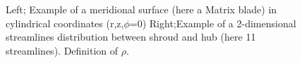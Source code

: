 \begin{figure}[h!]
\begin{minipage}[b]{0.5\linewidth}
 \centering
\end{minipage}
\begin{minipage}[b]{0.5\linewidth}
 \centering
\end{minipage}
\caption{Left; Example of a meridional surface (here a Matrix blade) in cylindrical coordinates (r,z,$\phi$=0) Right;Example of a 2-dimensional streamlines distribution between shroud and hub (here 11 streamlines). Definition of $\rho$.}
\label{param1}
\end{figure}
 

